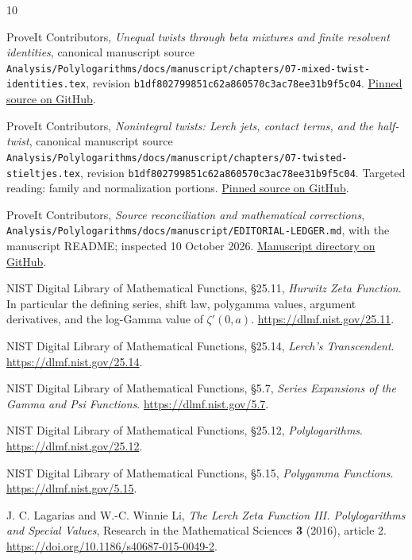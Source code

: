 \documentclass[11pt,a4paper]{article}
\numberwithin{equation}{section}
\theoremstyle{definition}\newtheorem{definition}[theorem]{Definition}
\theoremstyle{remark}\newtheorem{remark}[theorem]{Remark}
\newcommand{\pin}{\texttt{b1df802799851c62a860570c3ac78ee31b9f5c04}}
\newcommand{\pathref}[1]{\nolinkurl{#1}}
\begin{document}
\begin{thebibliography}{10}
\raggedright
{}
ProveIt Contributors, \emph{Unequal twists through beta mixtures and finite
resolvent identities}, canonical manuscript source
\pathref{Analysis/Polylogarithms/docs/manuscript/chapters/07-mixed-twist-identities.tex},
revision \pin.
\href{https://github.com/VladimirReshetnikov/ProveIt/blob/b1df802799851c62a860570c3ac78ee31b9f5c04/Analysis/Polylogarithms/docs/manuscript/chapters/07-mixed-twist-identities.tex}{Pinned source on GitHub}.

ProveIt Contributors, \emph{Nonintegral twists: Lerch jets, contact terms,
and the half-twist}, canonical manuscript source
\pathref{Analysis/Polylogarithms/docs/manuscript/chapters/07-twisted-stieltjes.tex},
revision \pin. Targeted reading: family and normalization portions.
\href{https://github.com/VladimirReshetnikov/ProveIt/blob/b1df802799851c62a860570c3ac78ee31b9f5c04/Analysis/Polylogarithms/docs/manuscript/chapters/07-twisted-stieltjes.tex}{Pinned source on GitHub}.

ProveIt Contributors, \emph{Source reconciliation and mathematical
corrections}, \pathref{Analysis/Polylogarithms/docs/manuscript/EDITORIAL-LEDGER.md},
with the manuscript README; inspected 10 October 2026.
\href{https://github.com/VladimirReshetnikov/ProveIt/tree/main/Analysis/Polylogarithms/docs/manuscript}{Manuscript directory on GitHub}.

NIST Digital Library of Mathematical Functions, \S25.11,
\emph{Hurwitz Zeta Function}. In particular the defining series,
shift law, polygamma values, argument derivatives, and the log-Gamma
value of $\zeta'(0,a)$. \url{https://dlmf.nist.gov/25.11}.

NIST Digital Library of Mathematical Functions, \S25.14,
\emph{Lerch's Transcendent}. \url{https://dlmf.nist.gov/25.14}.

NIST Digital Library of Mathematical Functions, \S5.7,
\emph{Series Expansions of the Gamma and Psi Functions}.
\url{https://dlmf.nist.gov/5.7}.

NIST Digital Library of Mathematical Functions, \S25.12,
\emph{Polylogarithms}. \url{https://dlmf.nist.gov/25.12}.

NIST Digital Library of Mathematical Functions, \S5.15,
\emph{Polygamma Functions}. \url{https://dlmf.nist.gov/5.15}.

J. C. Lagarias and W.-C. Winnie Li,
\emph{The Lerch Zeta Function III. Polylogarithms and Special Values},
Research in the Mathematical Sciences \textbf{3} (2016), article 2.
\url{https://doi.org/10.1186/s40687-015-0049-2}.
\end{thebibliography}
\end{document}

